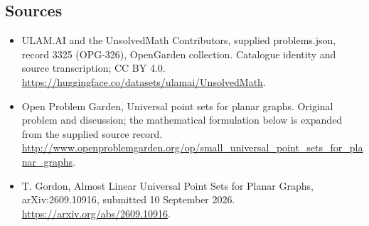 \documentclass[11pt,a4paper]{article}
\begin{document}
\subsection{Sources}
\begin{itemize}
\item[S1] ULAM.AI and the UnsolvedMath Contributors, supplied problems.json, record 3325 (OPG-326), OpenGarden collection. Catalogue identity and source transcription; CC BY 4.0.
\url{https://huggingface.co/datasets/ulamai/UnsolvedMath}.
\item[S2] Open Problem Garden, Universal point sets for planar graphs. Original problem and discussion; the mathematical formulation below is expanded from the supplied source record.
\url{http://www.openproblemgarden.org/op/small_universal_point_sets_for_planar_graphs}.

\item[R1] T. Gordon, Almost Linear Universal Point Sets for Planar Graphs,
arXiv:2609.10916, submitted 10 September 2026.
\url{https://arxiv.org/abs/2609.10916}.

\end{itemize}
\end{document}
